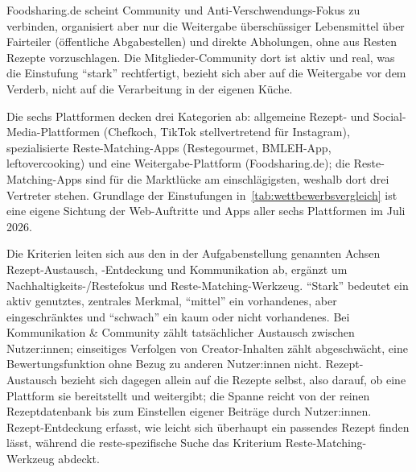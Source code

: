 Foodsharing.de scheint Community und Anti-Verschwendungs-Fokus zu verbinden, organisiert aber nur die Weitergabe überschüssiger Lebensmittel über Fairteiler (öffentliche Abgabestellen) und direkte Abholungen, ohne aus Resten Rezepte vorzuschlagen. Die Mitglieder-Community dort ist aktiv und real, was die Einstufung \enquote{stark} rechtfertigt, bezieht sich aber auf die Weitergabe vor dem Verderb, nicht auf die Verarbeitung in der eigenen Küche.

Die sechs Plattformen decken drei Kategorien ab: allgemeine Rezept- und Social-Media-Plattformen (Chefkoch, TikTok stellvertretend für Instagram), spezialisierte Reste-Matching-Apps (Restegourmet, \ac{BMLEH}-App, leftovercooking) und eine Weitergabe-Plattform (Foodsharing.de); die Reste-Matching-Apps sind für die Marktlücke am einschlägigsten, weshalb dort drei Vertreter stehen. Grundlage der Einstufungen in~\autoref{tab:wettbewerbsvergleich} ist eine eigene Sichtung der Web-Auftritte und Apps aller sechs Plattformen im Juli 2026.

Die Kriterien leiten sich aus den in der Aufgabenstellung genannten Achsen Rezept-Austausch, -Entdeckung und Kommunikation ab, ergänzt um Nachhaltigkeits-/Restefokus und Reste-Matching-Werkzeug. \enquote{Stark} bedeutet ein aktiv genutztes, zentrales Merkmal, \enquote{mittel} ein vorhandenes, aber eingeschränktes und \enquote{schwach} ein kaum oder nicht vorhandenes. Bei Kommunikation \& Community zählt tatsächlicher Austausch zwischen Nutzer:innen; einseitiges Verfolgen von Creator-Inhalten zählt abgeschwächt, eine Bewertungsfunktion ohne Bezug zu anderen Nutzer:innen nicht. Rezept-Austausch bezieht sich dagegen allein auf die Rezepte selbst, also darauf, ob eine Plattform sie bereitstellt und weitergibt; die Spanne reicht von der reinen Rezeptdatenbank bis zum Einstellen eigener Beiträge durch Nutzer:innen. Rezept-Entdeckung erfasst, wie leicht sich überhaupt ein passendes Rezept finden lässt, während die reste-spezifische Suche das Kriterium Reste-Matching-Werkzeug abdeckt.

